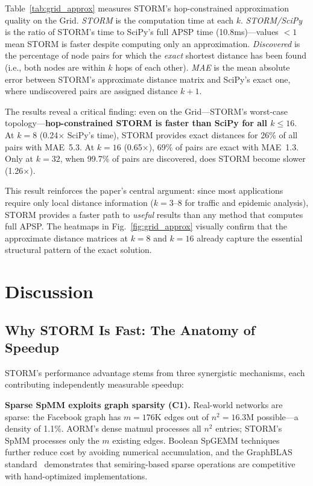 \documentclass[journal]{IEEEtran}
\begin{document}
Table~\ref{tab:grid_approx} measures STORM's hop-constrained approximation quality on the Grid. \emph{STORM} is the computation time at each $k$. \emph{STORM/SciPy} is the ratio of STORM's time to SciPy's full APSP time (10.8ms)---values $<1$ mean STORM is faster despite computing only an approximation. \emph{Discovered} is the percentage of node pairs for which the \emph{exact} shortest distance has been found (i.e., both nodes are within $k$ hops of each other). \emph{MAE} is the mean absolute error between STORM's approximate distance matrix and SciPy's exact one, where undiscovered pairs are assigned distance $k+1$.

The results reveal a critical finding: even on the Grid---STORM's worst-case topology---\textbf{hop-constrained STORM is faster than SciPy for all $k \leq 16$}. At $k=8$ (0.24$\times$ SciPy's time), STORM provides exact distances for 26\% of all pairs with MAE~5.3. At $k=16$ (0.65$\times$), 69\% of pairs are exact with MAE~1.3. Only at $k=32$, when 99.7\% of pairs are discovered, does STORM become slower (1.26$\times$).

This result reinforces the paper's central argument: since most applications require only local distance information ($k=3$--$8$ for traffic and epidemic analysis), STORM provides a faster path to \emph{useful} results than any method that computes full APSP. The heatmaps in Fig.~\ref{fig:grid_approx} visually confirm that the approximate distance matrices at $k=8$ and $k=16$ already capture the essential structural pattern of the exact solution.


\section{Discussion}

\subsection{Why STORM Is Fast: The Anatomy of Speedup}

STORM's performance advantage stems from three synergistic mechanisms, each contributing independently measurable speedup:

\textbf{Sparse SpMM exploits graph sparsity (C1).} Real-world networks are sparse: the Facebook graph has $m = 176$K edges out of $n^2 = 16.3$M possible---a density of 1.1\%. AORM's dense matmul processes all $n^2$ entries; STORM's SpMM processes only the $m$ existing edges. Boolean SpGEMM techniques~\cite{nagasaka2022bool} further reduce cost by avoiding numerical accumulation, and the GraphBLAS standard~\cite{davis2023graphblas,lagraph2022} demonstrates that semiring-based sparse operations are competitive with hand-optimized implementations.
\end{document}
